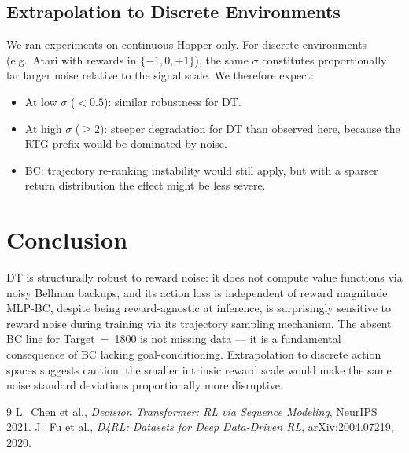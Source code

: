 \documentclass[10pt,a4paper,twocolumn]{article}
\begin{document}
\subsection{Extrapolation to Discrete Environments}
We ran experiments on continuous Hopper only. For discrete environments (e.g.\ Atari
with rewards in $\{-1,0,+1\}$), the same $\sigma$ constitutes proportionally far
larger noise relative to the signal scale. We therefore expect:
\begin{itemize}[noitemsep,topsep=2pt]
  \item At low $\sigma$ ($<0.5$): similar robustness for DT.
  \item At high $\sigma$ ($\geq2$): steeper degradation for DT than observed here,
        because the RTG prefix would be dominated by noise.
  \item BC: trajectory re-ranking instability would still apply, but with a sparser
        return distribution the effect might be less severe.
\end{itemize}

\section{Conclusion}

DT is structurally robust to reward noise: it does not compute value functions
via noisy Bellman backups, and its action loss is independent of reward magnitude.
MLP-BC, despite being reward-agnostic at inference, is surprisingly sensitive to
reward noise during training via its trajectory sampling mechanism.
The absent BC line for Target~=~1800 is not missing data — it is a fundamental
consequence of BC lacking goal-conditioning. Extrapolation to discrete action
spaces suggests caution: the smaller intrinsic reward scale would make the same
noise standard deviations proportionally more disruptive.

\begin{thebibliography}{9}\small
{}
L.~Chen et al., \textit{Decision Transformer: RL via Sequence Modeling}, NeurIPS 2021.
J.~Fu et al., \textit{D4RL: Datasets for Deep Data-Driven RL}, arXiv:2004.07219, 2020.
\end{thebibliography}
\end{document}
